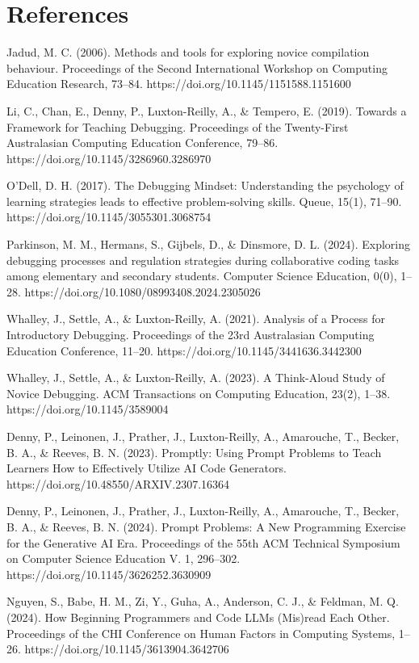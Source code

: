 \documentclass[12pt]{extarticle}
\begin{document}
\section{References}
\begin{thebibliography}{9}

Jadud, M. C. (2006). Methods and tools for exploring novice compilation behaviour. Proceedings of the Second International Workshop on Computing Education Research, 73–84. https://doi.org/10.1145/1151588.1151600

Li, C., Chan, E., Denny, P., Luxton-Reilly, A., \& Tempero, E. (2019). Towards a Framework for Teaching Debugging. Proceedings of the Twenty-First Australasian Computing Education Conference, 79–86. https://doi.org/10.1145/3286960.3286970

O’Dell, D. H. (2017). The Debugging Mindset: Understanding the psychology of learning strategies leads to effective problem-solving skills. Queue, 15(1), 71–90. https://doi.org/10.1145/3055301.3068754

Parkinson, M. M., Hermans, S., Gijbels, D., \& Dinsmore, D. L. (2024). Exploring debugging processes and regulation strategies during collaborative coding tasks among elementary and secondary students. Computer Science Education, 0(0), 1–28. https://doi.org/10.1080/08993408.2024.2305026

Whalley, J., Settle, A., \& Luxton-Reilly, A. (2021). Analysis of a Process for Introductory Debugging. Proceedings of the 23rd Australasian Computing Education Conference, 11–20. https://doi.org/10.1145/3441636.3442300

Whalley, J., Settle, A., \& Luxton-Reilly, A. (2023). A Think-Aloud Study of Novice Debugging. ACM Transactions on Computing Education, 23(2), 1–38. https://doi.org/10.1145/3589004

Denny, P., Leinonen, J., Prather, J., Luxton-Reilly, A., Amarouche, T., Becker, B. A., \& Reeves, B. N. (2023). Promptly: Using Prompt Problems to Teach Learners How to Effectively Utilize AI Code Generators. https://doi.org/10.48550/ARXIV.2307.16364

Denny, P., Leinonen, J., Prather, J., Luxton-Reilly, A., Amarouche, T., Becker, B. A., \& Reeves, B. N. (2024). Prompt Problems: A New Programming Exercise for the Generative AI Era. Proceedings of the 55th ACM Technical Symposium on Computer Science Education V. 1, 296–302. https://doi.org/10.1145/3626252.3630909

Nguyen, S., Babe, H. M., Zi, Y., Guha, A., Anderson, C. J., \& Feldman, M. Q. (2024). How Beginning Programmers and Code LLMs (Mis)read Each Other. Proceedings of the CHI Conference on Human Factors in Computing Systems, 1–26. https://doi.org/10.1145/3613904.3642706

\end{thebibliography}
\end{document}
